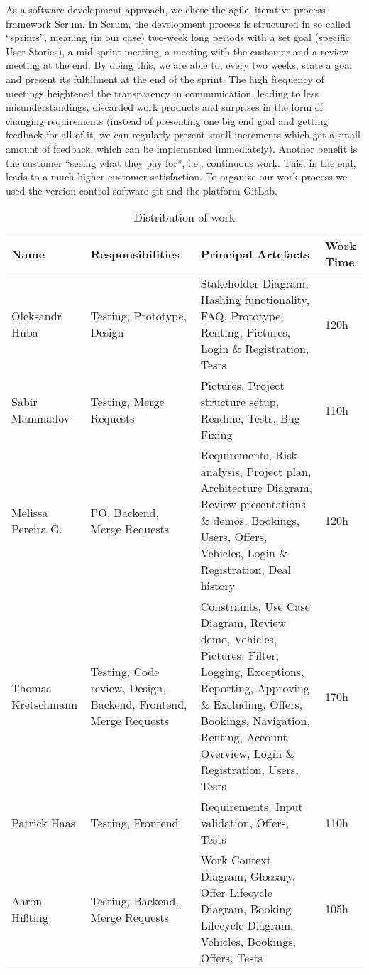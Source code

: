 As a software development approach, we chose the agile, iterative process framework Scrum. In Scrum, the development process is structured in so called “sprints”, meaning (in our case) two-week long periods with a set goal (specific User Stories), a mid-sprint meeting, a meeting with the customer and a review meeting at the end. By doing this, we are able to, every two weeks, state a goal and present its fulfillment at the end of the sprint. The high frequency of meetings heightened the transparency in communication, leading to less misunderstandings, discarded work products and surprises in the form of changing requirements (instead of presenting one big end goal and getting feedback for all of it, we can regularly present small increments which get a small amount of feedback, which can be implemented immediately). Another benefit is the customer “seeing what they pay for”, i.e., continuous work. This, in the end, leads to a much higher customer satisfaction. To organize our work process we used the version control software git and the platform GitLab.

\begin{table}[h]
  \caption{Distribution of work}
  \centering
  \begin{tabular}{|p{3cm}||p{3cm}|p{6cm}|p{2cm}|}
    \hline
    Name & Responsibilities & Principal Artefacts & Work Time \\
    \hline
    Oleksandr Huba & Testing, Prototype, Design & Stakeholder Diagram, Hashing functionality, FAQ, Prototype, Renting, Pictures, Login \& Registration, Tests & 120h\\ 
    \hline
    Sabir Mammadov & Testing, Merge Requests & Pictures, Project structure setup, Readme, Tests, Bug Fixing & 110h\\ 
    \hline
    Melissa Pereira G. & PO, Backend, Merge Requests & Requirements, Risk analysis, Project plan, Architecture Diagram, Review presentations \& demos, Bookings, Users, Offers, Vehicles, Login \& Registration, Deal history & 120h\\ 
    \hline
    Thomas Kretschmann & Testing, Code review, Design, Backend, Frontend, Merge Requests & Constraints, Use Case Diagram, Review demo, Vehicles, Pictures, Filter, Logging, Exceptions, Reporting, Approving \& Excluding, Offers, Bookings, Navigation, Renting, Account Overview, Login \& Registration, Users, Tests & 170h\\ 
    \hline
    Patrick Haas & Testing, Frontend & Requirements, Input validation, Offers, Tests & 110h\\ 
    \hline
    Aaron Hißting & Testing, Backend, Merge Requests & Work Context Diagram, Glossary, Offer Lifecycle Diagram, Booking Lifecycle Diagram, Vehicles, Bookings, Offers, Tests & 105h\\ 
    \hline
  \end{tabular}
\end{table}